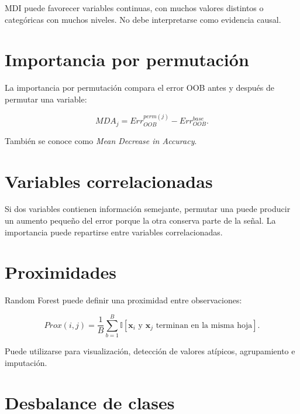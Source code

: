 \documentclass[
  spanish,
  10.5pt,
  letterpaper,
  DIV=11,
  numbers=noendperiod,
  oneside,
  open=any]{scrreprt}
\theoremstyle{definition}
\theoremstyle{definition}
\theoremstyle{plain}
\theoremstyle{remark}
\begin{document}

MDI puede favorecer variables continuas, con muchos valores distintos o
categóricas con muchos niveles. No debe interpretarse como evidencia
causal.

\section*{Importancia por
permutación}\label{importancia-por-permutaciuxf3n-1}


La importancia por permutación compara el error OOB antes y después de
permutar una variable:

\[
MDA_j
=
Err_{OOB}^{perm(j)}
-
Err_{OOB}^{base}.
\]

También se conoce como \emph{Mean Decrease in Accuracy}.

\section*{Variables correlacionadas}\label{variables-correlacionadas}


Si dos variables contienen información semejante, permutar una puede
producir un aumento pequeño del error porque la otra conserva parte de
la señal. La importancia puede repartirse entre variables
correlacionadas.

\section*{Proximidades}\label{proximidades}


Random Forest puede definir una proximidad entre observaciones:

\[
Prox(i,j)
=
\frac{1}{B}
\sum_{b=1}^{B}
\mathbb{I}
\left[
\mathbf{x}_i
\text{ y }
\mathbf{x}_j
\text{ terminan en la misma hoja}
\right].
\]

Puede utilizarse para visualización, detección de valores atípicos,
agrupamiento e imputación.

\section*{Desbalance de clases}\label{desbalance-de-clases-1}
\end{document}
